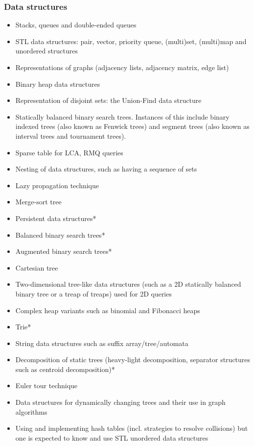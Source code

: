 \documentclass[12pt]{article}
\begin{document}
		\subsubsection{Data structures}
		\begin{itemize}[label=]
			\item Stacks, queues and double-ended queues
			\item STL data structures: pair, vector, priority queue, (multi)set, (multi)map and unordered structures
			\item Representations of graphs (adjacency lists, adjacency matrix, edge list)
			\item Binary heap data structures
			\item Representation of disjoint sets: the Union-Find data structure
			\item Statically balanced binary search trees. Instances of this include binary indexed trees (also known as Fenwick trees) and segment trees (also known as interval trees and tournament trees).
			\item Sparse table for LCA, RMQ queries
			\item Nesting of data structures, such as having a sequence of sets
		\end{itemize}
		
		\begin{itemize}[label=]
			\item Lazy propagation technique
			\item Merge-sort tree
			\item Persistent data structures*
			\item Balanced binary search trees*
			\item Augmented binary search trees*
			\item Cartesian tree
			\item Two-dimensional tree-like data structures (such as a 2D statically balanced binary tree or a treap of treaps) used for 2D queries
			\item Complex heap variants such as binomial and Fibonacci heaps
			\item Trie*
			\item String data structures such as suffix array/tree/automata
			\item Decomposition of static trees (heavy-light decomposition, separator structures such as centroid decomposition)*
			\item Euler tour technique
			\item Data structures for dynamically changing trees and their use in graph algorithms
			\item Using and implementing hash tables (incl. strategies to resolve collisions) but one is expected to know and use STL unordered data structures
		\end{itemize}
		
\end{document}
